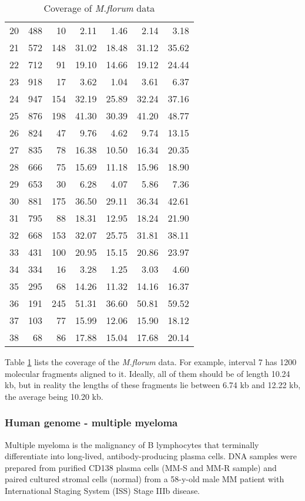 \begin{table}[H]
\begin{tabular}{lrrr|rrr}
   20 & 488 & 10 & 2.11 & 1.46 & 2.14 & 3.18 \\ 
   21 & 572 & 148 & 31.02 & 18.48 & 31.12 & 35.62 \\ 
   22 & 712 & 91 & 19.10 & 14.66 & 19.12 & 24.44 \\ 
   23 & 918 & 17 & 3.62 & 1.04 & 3.61 & 6.37 \\ 
   24 & 947 & 154 & 32.19 & 25.89 & 32.24 & 37.16 \\ 
   25 & 876 & 198 & 41.30 & 30.39 & 41.20 & 48.77 \\ 
   26 & 824 & 47 & 9.76 & 4.62 & 9.74 & 13.15 \\ 
   27 & 835 & 78 & 16.38 & 10.50 & 16.34 & 20.35 \\ 
   28 & 666 & 75 & 15.69 & 11.18 & 15.96 & 18.90 \\ 
   29 & 653 & 30 & 6.28 & 4.07 & 5.86 & 7.36 \\ 
   30 & 881 & 175 & 36.50 & 29.11 & 36.34 & 42.61 \\ 
   31 & 795 & 88 & 18.31 & 12.95 & 18.24 & 21.90 \\ 
   32 & 668 & 153 & 32.07 & 25.75 & 31.81 & 38.11 \\ 
   33 & 431 & 100 & 20.95 & 15.15 & 20.86 & 23.97 \\ 
   34 & 334 & 16 & 3.28 & 1.25 & 3.03 & 4.60 \\ 
   35 & 295 & 68 & 14.26 & 11.32 & 14.16 & 16.37 \\ 
   36 & 191 & 245 & 51.31 & 36.60 & 50.81 & 59.52 \\ 
   37 & 103 & 77 & 15.99 & 12.06 & 15.90 & 18.12 \\ 
   38 &  68 & 86 & 17.88 & 15.04 & 17.68 & 20.14 \\ 
  \hline
  \hline
\end{tabular}
\caption{Coverage of {\emph{M.florum}} data}
\label{tab:mftable}
\end{table}

Table \ref{tab:mftable} lists the coverage of the {\emph{M.florum}} data. For example, interval 7 has 1200 molecular fragments aligned to it. Ideally, all of them should be of length 10.24 kb, but in reality the lengths of these fragments lie between 6.74 kb and 12.22 kb, the average being 10.20 kb. 

\subsubsection{Human genome - multiple myeloma}
Multiple myeloma is the malignancy of B lymphocytes that terminally differentiate into long-lived, antibody-producing plasma cells. DNA samples were prepared from purified CD138 plasma cells
(MM-S and MM-R sample) and paired cultured stromal cells (normal) from a 58-y-old male MM patient with International Staging System (ISS) Stage IIIb disease. 

